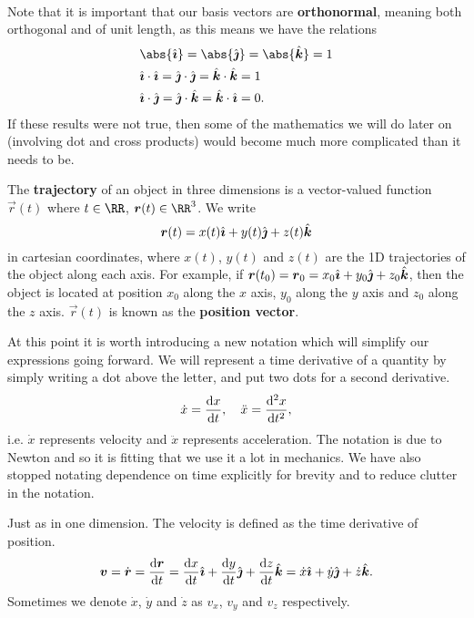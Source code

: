 \documentclass[../classical_mechanics.tex]{subfiles}
\begin{document}
        \paragraph{}
        Note that it is important that our basis vectors are \textbf{orthonormal}, meaning both orthogonal and of unit length, as this means we have the relations
        \begin{align*}
            &\abs{\ihat}=\abs{\jhat}=\abs{\khat}=1\\
            &\ihat\cdot\ihat=\jhat\cdot\jhat=\khat\cdot\khat=1\\
            &\ihat\cdot\jhat=\jhat\cdot\khat=\khat\cdot\ihat=0.
        \end{align*}
        If these results were not true, then some of the mathematics we will do later on (involving dot and cross products) would become much more complicated than it needs to be.
        \begin{definition}
            The \textbf{trajectory} of an object in three dimensions is a vector-valued function $\vec{r}(t)$ where $t\in\RR$, $\vec{r}(t)\in\RR^3$.
            We write
            \begin{equation}
                \boldsymbol{r}(t)=x(t)\hat{\boldsymbol{\imath}}+y(t)\hat{\boldsymbol{\jmath}}+z(t)\hat{\boldsymbol{k}}
            \end{equation}
            in cartesian coordinates, where $x(t)$, $y(t)$ and $z(t)$ are the 1D trajectories of the object along each axis.
            For example, if $\boldsymbol{r}(t_0)=\boldsymbol{r}_0=x_0\hat{\boldsymbol{\imath}}+y_0\hat{\boldsymbol{\jmath}}+z_0\hat{\boldsymbol{k}}$, then the object is located at position $x_0$ along the $x$ axis, $y_0$ along the $y$ axis and $z_0$ along the $z$ axis.
            $\vec{r}(t)$ is known as the \textbf{position vector}.
        \end{definition}
        At this point it is worth introducing a new notation which will simplify our expressions going forward.
        We will represent a time derivative of a quantity by simply writing a dot above the letter, and put two dots for a second derivative.
        \begin{equation*}
            \dot{x}=\dv{x}{t},\quad\ddot{x}=\dv[2]{x}{t},
        \end{equation*}
        i.e. $\dot x$ represents velocity and $\ddot x$ represents acceleration.
        The notation is due to Newton and so it is fitting that we use it a lot in mechanics.
        We have also stopped notating dependence on time explicitly for brevity and to reduce clutter in the notation.
        \begin{definition}
            Just as in one dimension.
            The velocity is defined as the time derivative of position.
            \begin{equation}
                \vec{v}=\dot{\vec{r}}=\dv{\vec{r}}{t}=\dv{x}{t}\ihat+\dv{y}{t}\jhat+\dv{z}{t}\khat=\dot{x}\ihat+\dot{y}\jhat+\dot{z}\khat.
            \end{equation}
            Sometimes we denote $\dot{x}$, $\dot{y}$ and $\dot{z}$ as $v_x$, $v_y$ and $v_z$ respectively.
        \end{definition}
\end{document}
